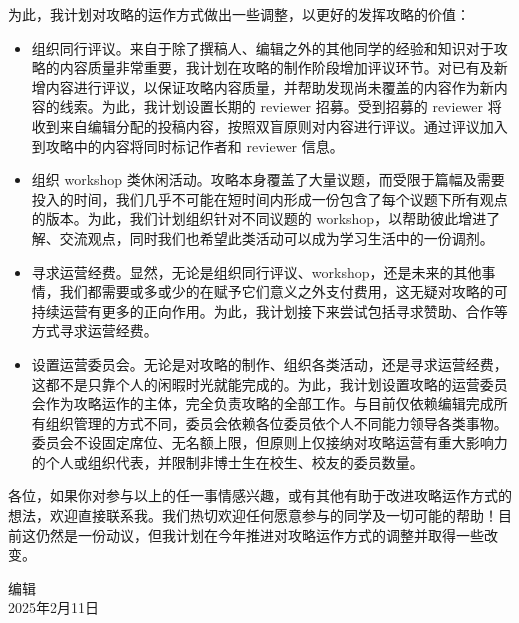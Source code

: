 为此，我计划对攻略的运作方式做出一些调整，以更好的发挥攻略的价值：
\begin{itemize}
    \item 组织同行评议。来自于除了撰稿人、编辑之外的其他同学的经验和知识对于攻略的内容质量非常重要，我计划在攻略的制作阶段增加评议环节。对已有及新增内容进行评议，以保证攻略内容质量，并帮助发现尚未覆盖的内容作为新内容的线索。为此，我计划设置长期的 reviewer 招募。受到招募的 reviewer 将收到来自编辑分配的投稿内容，按照双盲原则对内容进行评议。通过评议加入到攻略中的内容将同时标记作者和 reviewer 信息。
    \item 组织 workshop 类休闲活动。攻略本身覆盖了大量议题，而受限于篇幅及需要投入的时间，我们几乎不可能在短时间内形成一份包含了每个议题下所有观点的版本。为此，我们计划组织针对不同议题的 workshop，以帮助彼此增进了解、交流观点，同时我们也希望此类活动可以成为学习生活中的一份调剂。
    \item 寻求运营经费。显然，无论是组织同行评议、workshop，还是未来的其他事情，我们都需要或多或少的在赋予它们意义之外支付费用，这无疑对攻略的可持续运营有更多的正向作用。为此，我计划接下来尝试包括寻求赞助、合作等方式寻求运营经费。
    \item 设置运营委员会。无论是对攻略的制作、组织各类活动，还是寻求运营经费，这都不是只靠个人的闲暇时光就能完成的。为此，我计划设置攻略的运营委员会作为攻略运作的主体，完全负责攻略的全部工作。与目前仅依赖编辑完成所有组织管理的方式不同，委员会依赖各位委员依个人不同能力领导各类事物。委员会不设固定席位、无名额上限，但原则上仅接纳对攻略运营有重大影响力的个人或组织代表，并限制非博士生在校生、校友的委员数量。
    
\end{itemize}

\vspace{5mm}

各位，如果你对参与以上的任一事情感兴趣，或有其他有助于改进攻略运作方式的想法，欢迎直接联系我。我们热切欢迎任何愿意参与的同学及一切可能的帮助！目前这仍然是一份动议，但我计划在今年推进对攻略运作方式的调整并取得一些改变。

\begin{flushright}
    编辑 \Shiyao\\
    2025年2月11日
\end{flushright}